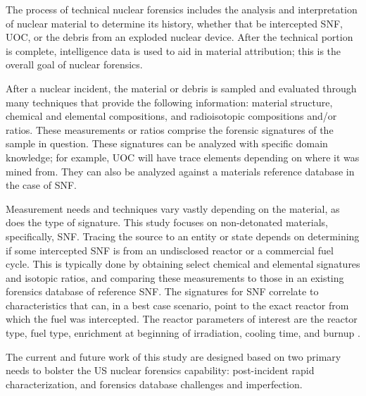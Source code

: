 The process of technical nuclear forensics includes the analysis and
interpretation of nuclear material to determine its history, whether that be
intercepted \gls{SNF}, \gls{UOC}, or the debris from an exploded nuclear
device. After the technical portion is complete, intelligence data is used
to aid in material attribution; this is the overall goal of nuclear forensics. 

After a nuclear incident, the material or debris is sampled and evaluated
through many techniques that provide the following information: material
structure, chemical and elemental compositions, and radioisotopic compositions
and/or ratios.  These measurements or ratios comprise the forensic signatures
of the sample in question. These signatures can be analyzed with specific
domain knowledge; for example, \gls{UOC} will have trace elements depending on
where it was mined from.  They can also be analyzed against a materials
reference database in the case of \gls{SNF}.

Measurement needs and techniques vary vastly depending on the material, as does
the type of signature. This study focuses on non-detonated materials,
specifically, \gls{SNF}. Tracing the source to an entity or state depends on
determining if some intercepted \gls{SNF} is from an undisclosed reactor or a
commercial fuel cycle. This is typically done by obtaining select chemical and
elemental signatures and isotopic ratios, and comparing these measurements to
those in an existing forensics database of reference \gls{SNF}.  The signatures
for \gls{SNF} correlate to characteristics that can, in a best case scenario,
point to the exact reactor from which the fuel was intercepted.  The reactor
parameters of interest are the reactor type, fuel type, enrichment at beginning
of irradiation, cooling time, and burnup \cite{weber_2006, weber_2010,
weber_2011}.

The current and future work of this study are designed based on two primary
needs to bolster the \gls{US} nuclear forensics capability: post-incident rapid
characterization, and forensics database challenges and imperfection.  


